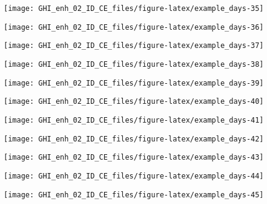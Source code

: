 \documentclass[
  10pt,
  a4paper,oneside]{article}
\begin{document}
\begin{center}\texttt{[image: GHI\_enh\_02\_ID\_CE\_files/figure-latex/example\_days-35]} \end{center}

\begin{center}\texttt{[image: GHI\_enh\_02\_ID\_CE\_files/figure-latex/example\_days-36]} \end{center}

\begin{center}\texttt{[image: GHI\_enh\_02\_ID\_CE\_files/figure-latex/example\_days-37]} \end{center}

\begin{center}\texttt{[image: GHI\_enh\_02\_ID\_CE\_files/figure-latex/example\_days-38]} \end{center}

\begin{center}\texttt{[image: GHI\_enh\_02\_ID\_CE\_files/figure-latex/example\_days-39]} \end{center}

\begin{center}\texttt{[image: GHI\_enh\_02\_ID\_CE\_files/figure-latex/example\_days-40]} \end{center}

\begin{center}\texttt{[image: GHI\_enh\_02\_ID\_CE\_files/figure-latex/example\_days-41]} \end{center}

\begin{center}\texttt{[image: GHI\_enh\_02\_ID\_CE\_files/figure-latex/example\_days-42]} \end{center}

\begin{center}\texttt{[image: GHI\_enh\_02\_ID\_CE\_files/figure-latex/example\_days-43]} \end{center}

\begin{center}\texttt{[image: GHI\_enh\_02\_ID\_CE\_files/figure-latex/example\_days-44]} \end{center}

\begin{center}\texttt{[image: GHI\_enh\_02\_ID\_CE\_files/figure-latex/example\_days-45]} \end{center}
\end{document}
